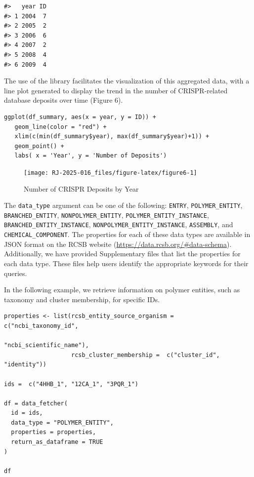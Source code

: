 \begin{verbatim}
#>   year ID
#> 1 2004  7
#> 2 2005  2
#> 3 2006  6
#> 4 2007  2
#> 5 2008  4
#> 6 2009  4
\end{verbatim}

The use of the  library facilitates the visualization of this aggregated data, with a line plot generated to display the trend in the number of CRISPR-related database deposits over time (Figure 6).

\begin{verbatim}
ggplot(df_summary, aes(x = year, y = ID)) +
   geom_line(color = "red") +
   xlim(c(min(df_summary$year), max(df_summary$year)+1)) +
   geom_point() +
   labs( x = 'Year', y = 'Number of Deposits')
\end{verbatim}

\begin{figure}[H]
\texttt{[image: RJ-2025-016\_files/figure-latex/figure6-1]} \caption{Number of CRISPR Deposits by Year}\label{fig:figure6}
\end{figure}

The \texttt{data\_type} argument can be one of the following: \texttt{ENTRY}, \texttt{POLYMER\_ENTITY}, \texttt{BRANCHED\_ENTITY}, \texttt{NONPOLYMER\_ENTITY}, \texttt{POLYMER\_ENTITY\_INSTANCE}, \texttt{BRANCHED\_ENTITY\_INSTANCE}, \texttt{NONPOLYMER\_ENTITY\_INSTANCE}, \texttt{ASSEMBLY}, and \texttt{CHEMICAL\_COMPONENT}. The properties for each of these data types are available in JSON format on the RCSB website (\url{https://data.rcsb.org/\#data-schema}). Additionally, we have provided Supplementary files that list the properties for each data type. These files help users identify the appropriate keywords for their queries.

In the following example, we retrieve information on polymer entities, such as taxonomy and cluster membership, for specific IDs.

\begin{verbatim}
properties <- list(rcsb_entity_source_organism =  c("ncbi_taxonomy_id", 
                                                    "ncbi_scientific_name"),
                   rcsb_cluster_membership =  c("cluster_id", "identity"))

ids =  c("4HHB_1", "12CA_1", "3PQR_1")

df = data_fetcher(
  id = ids,
  data_type = "POLYMER_ENTITY",
  properties = properties,
  return_as_dataframe = TRUE
)

df
\end{verbatim}

